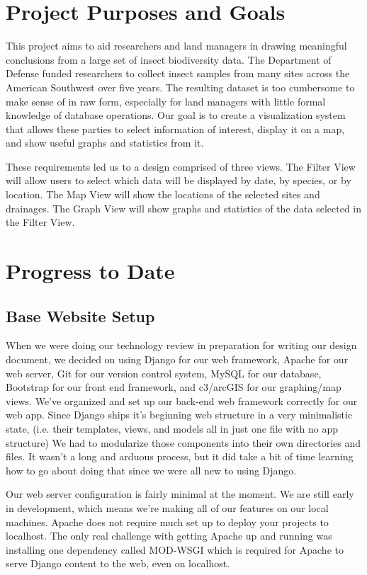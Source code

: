 \documentclass[journal]{IEEEtran}
\begin{document}
\section{Project Purposes and Goals}
This project aims to aid researchers and land managers in drawing meaningful
conclusions from a large set of insect biodiversity data. The Department of
Defense funded researchers to collect insect samples from many sites across the
American Southwest over five years. The resulting dataset is too cumbersome to
make sense of in raw form, especially for land managers with little formal
knowledge of database operations. Our goal is to create a visualization system
that allows these parties to select information of interest, display it on a
map, and show useful graphs and statistics from it.


These requirements led us to a design comprised of three views. The Filter
View will allow users to select which data will be displayed by date, by
species, or by location. The Map View will show the locations of the selected
sites and drainages. The Graph View will show graphs and statistics of the data
selected in the Filter View.


\section{Progress to Date}

\subsection{Base Website Setup}
When we were doing our technology review in preparation for writing our design
document, we decided on using Django for our web framework, Apache for our web
server, Git for our version control system, MySQL for our database, Bootstrap
for our front end framework, and c3/arcGIS for our graphing/map views.
We’ve organized and set up our back-end web framework correctly for our web
app. Since Django ships it’s beginning web structure in a very minimalistic
state, (i.e. their templates, views, and models all in just one file with
no app structure) We had to modularize those components into their own
directories and files. It wasn’t a long and arduous process, but it did
take a bit of time learning how to go about doing that since we were all
new to using Django.


Our web server configuration is fairly minimal at the moment. We are still
early in development, which means we’re making all of our features on our local
machines. Apache does not require much set up to deploy your projects to
localhost. The only real challenge with getting Apache up and running was
installing one dependency called MOD-WSGI which is required for Apache to
serve Django content to the web, even on localhost.
\end{document}
